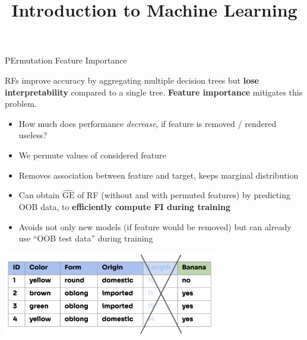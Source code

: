 \documentclass[11pt,compress,t,notes=noshow, xcolor=table]{beamer}
\title{Introduction to Machine Learning}
\begin{document}

\begin{vbframe}{PErmutation Feature Importance}

  \begin{footnotesize}

RFs improve accuracy by aggregating multiple decision trees but \textbf{lose interpretability} compared to a single tree. \textbf{Feature importance} mitigates this problem.
\begin{itemize}
  \item How much does performance \textit{decrease}, if feature is removed / rendered useless?
  \item We permute values of considered feature
  \item Removes association between feature and target, keeps marginal distribution
  \item Can obtain $\widehat{\mathrm{GE}}$ of RF (without and with permuted features)
    by predicting OOB data, to \textbf{efficiently compute FI during training}
  \item Avoids not only new models (if feature would be removed) but can already use ``OOB test data''
    during training
\end{itemize}
\end{footnotesize}

\vspace{-1ex}
\begin{center}
\includegraphics[width=0.7\textwidth]{figure_man/forest-fimp_idea.png}
\end{center}

\end{vbframe}
\end{document}
